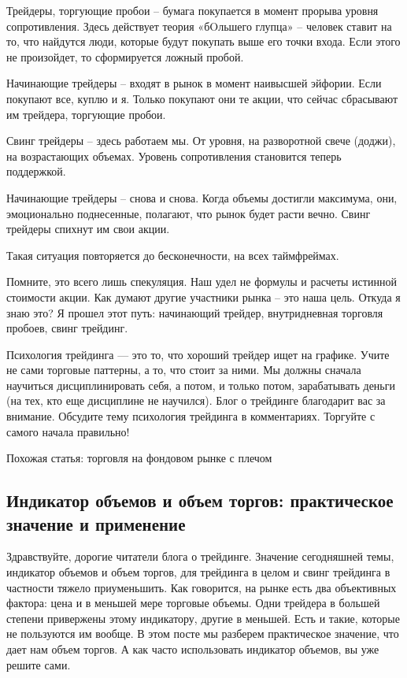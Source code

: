 \documentclass{book}
\begin{document}
Трейдеры, торгующие пробои – бумага покупается в момент прорыва уровня сопротивления. Здесь действует теория «бOльшего глупца» – человек ставит на то, что найдутся люди, которые будут покупать выше его точки входа. Если этого не произойдет, то сформируется ложный пробой.

Начинающие трейдеры – входят в рынок в момент наивысшей эйфории. Если покупают все, куплю и я. Только покупают они те акции, что сейчас сбрасывают им трейдера, торгующие пробои.

Свинг трейдеры – здесь работаем мы. От уровня, на разворотной свече (доджи), на возрастающих объемах. Уровень сопротивления становится теперь поддержкой.

Начинающие трейдеры – снова и снова. Когда объемы достигли максимума, они, эмоционально поднесенные, полагают, что рынок будет расти вечно. Свинг трейдеры спихнут им свои акции.

Такая ситуация повторяется до бесконечности, на всех таймфреймах.

Помните, это всего лишь спекуляция. Наш удел не формулы и расчеты истинной стоимости акции. Как думают другие участники рынка – это наша цель. Откуда я знаю это? Я прошел этот путь: начинающий трейдер, внутридневная торговля пробоев, свинг трейдинг.

Психология трейдинга — это то, что хороший трейдер ищет на графике. Учите не сами торговые паттерны, а то, что стоит за ними. Мы должны сначала научиться дисциплинировать себя, а потом, и только потом, зарабатывать деньги (на тех, кто еще дисциплине не научился). Блог о трейдинге благодарит вас за внимание. Обсудите тему психология трейдинга в комментариях. Торгуйте с самого начала правильно!


Похожая статья: торговля на фондовом рынке с плечом

\subsection{Индикатор объемов и объем торгов: практическое значение и
  применение}

Здравствуйте, дорогие читатели блога о трейдинге. Значение сегодняшней
темы, индикатор объемов и объем торгов, для трейдинга в целом и свинг
трейдинга в частности тяжело приуменьшить. Как говорится, на рынке
есть два объективных фактора: цена и в меньшей мере торговые
объемы. Одни трейдера в большей степени привержены этому индикатору,
другие в меньшей. Есть и такие, которые не пользуются им вообще. В
этом посте мы разберем практическое значение, что дает нам объем
торгов. А как часто использовать индикатор объемов, вы уже решите
сами.
\end{document}
